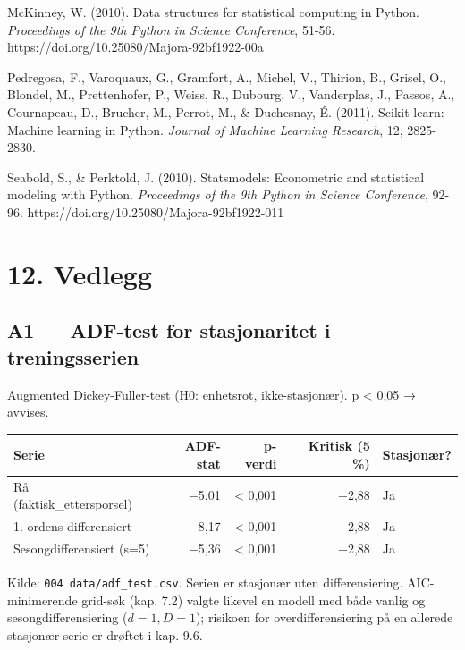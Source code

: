 \documentclass[
  norsk,
  11pt,
  a4paper,
]{article}
\newcounter{none} %
\begin{document}
McKinney, W. (2010). Data structures for statistical computing in
Python. \emph{Proceedings of the 9th Python in Science Conference},
51-56. https://doi.org/10.25080/Majora-92bf1922-00a

Pedregosa, F., Varoquaux, G., Gramfort, A., Michel, V., Thirion, B.,
Grisel, O., Blondel, M., Prettenhofer, P., Weiss, R., Dubourg, V.,
Vanderplas, J., Passos, A., Cournapeau, D., Brucher, M., Perrot, M., \&
Duchesnay, É. (2011). Scikit-learn: Machine learning in Python.
\emph{Journal of Machine Learning Research}, 12, 2825-2830.

Seabold, S., \& Perktold, J. (2010). Statsmodels: Econometric and
statistical modeling with Python. \emph{Proceedings of the 9th Python in
Science Conference}, 92-96. https://doi.org/10.25080/Majora-92bf1922-011

\newpage

\section{12. Vedlegg}\label{vedlegg}

\subsection{A1 --- ADF-test for stasjonaritet i
treningsserien}\label{a1-adf-test-for-stasjonaritet-i-treningsserien}

Augmented Dickey-Fuller-test (H0: enhetsrot, ikke-stasjonær). p
\textless{} 0,05 → avvises.

{\def\LTcaptype{none} %
\begin{longtable}[]{@{}lrrrl@{}}
\toprule\noalign{}
Serie & ADF-stat & p-verdi & Kritisk (5 \%) & Stasjonær? \\
\midrule\noalign{}
\endhead
\bottomrule\noalign{}
\endlastfoot
Rå (faktisk\_ettersporsel) & −5,01 & \textless{} 0,001 & −2,88 & Ja \\
1. ordens differensiert & −8,17 & \textless{} 0,001 & −2,88 & Ja \\
Sesongdifferensiert (s=5) & −5,36 & \textless{} 0,001 & −2,88 & Ja \\
\end{longtable}
}

Kilde: \texttt{004\ data/adf\_test.csv}. Serien er stasjonær uten
differensiering. AIC-minimerende grid-søk (kap. 7.2) valgte likevel en
modell med både vanlig og sesongdifferensiering (\(d=1, D=1\)); risikoen
for overdifferensiering på en allerede stasjonær serie er drøftet i kap.
9.6.
\end{document}
